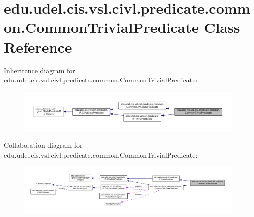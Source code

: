 \hypertarget{classedu_1_1udel_1_1cis_1_1vsl_1_1civl_1_1predicate_1_1common_1_1CommonTrivialPredicate}{}\section{edu.\+udel.\+cis.\+vsl.\+civl.\+predicate.\+common.\+Common\+Trivial\+Predicate Class Reference}
\label{classedu_1_1udel_1_1cis_1_1vsl_1_1civl_1_1predicate_1_1common_1_1CommonTrivialPredicate}


Inheritance diagram for edu.\+udel.\+cis.\+vsl.\+civl.\+predicate.\+common.\+Common\+Trivial\+Predicate\+:
\nopagebreak
\begin{figure}[H]
\begin{center}
\leavevmode
\includegraphics[width=350pt]{classedu_1_1udel_1_1cis_1_1vsl_1_1civl_1_1predicate_1_1common_1_1CommonTrivialPredicate__inherit__graph}
\end{center}
\end{figure}


Collaboration diagram for edu.\+udel.\+cis.\+vsl.\+civl.\+predicate.\+common.\+Common\+Trivial\+Predicate\+:
\nopagebreak
\begin{figure}[H]
\begin{center}
\leavevmode
\includegraphics[width=350pt]{classedu_1_1udel_1_1cis_1_1vsl_1_1civl_1_1predicate_1_1common_1_1CommonTrivialPredicate__coll__graph}
\end{center}
\end{figure}
